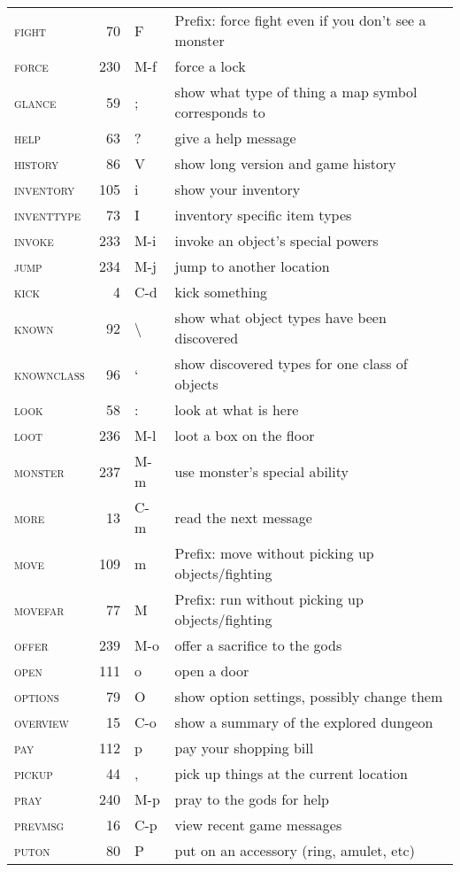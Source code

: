 \documentclass{article}
\begin{document}
\begin{center}
\begin{longtable}{>{\scshape}lr>{\ttfamily}ll}
    fight & 70 & F  & Prefix: force fight even if you don't see a monster\\
    force & 230 & M-f  & force a lock\\
    glance & 59 & ;  & show what type of thing a map symbol corresponds to\\
    help & 63 & ?  & give a help message\\
    history & 86 & V  & show long version and game history\\
    inventory & 105 & i  & show your inventory\\
    inventtype & 73 & I  & inventory specific item types\\
    invoke & 233 & M-i  & invoke an object's special powers\\
    jump & 234 & M-j  & jump to another location\\
    kick & 4 & C-d  & kick something\\
    known & 92 & \textbackslash  & show what object types have been discovered\\
    knownclass & 96 & `  & show discovered types for one class of objects\\
    look & 58 & :  & look at what is here\\
    loot & 236 & M-l  & loot a box on the floor\\
    monster & 237 & M-m  & use monster's special ability\\
    more & 13 & C-m  & read the next message\\
    move & 109 & m  & Prefix: move without picking up objects/fighting\\
    movefar & 77 & M & Prefix: run without picking up objects/fighting\\
offer & 239 & M-o  & offer a sacrifice to the gods\\
    open & 111 & o  & open a door\\
    options & 79 & O  & show option settings, possibly change them\\
    overview & 15 & C-o  & show a summary of the explored dungeon\\
    pay & 112 & p  & pay your shopping bill\\
    pickup & 44 & ,  & pick up things at the current location\\
    pray & 240 & M-p  & pray to the gods for help\\
    prevmsg & 16 & C-p  & view recent game messages\\
    puton & 80 & P  & put on an accessory (ring, amulet, etc)\\

\end{longtable}
\end{center}
\end{document}
